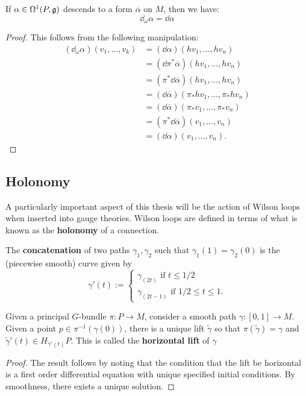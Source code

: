 		\begin{lemma}
			If $\alpha \in \Omega^1 (P, \frak g)$ descends to a form $\overline \alpha$ on $M$, then we have:
			\begin{equation}
				\dd_\omega \alpha = \dd \alpha
			\end{equation}
			\label{lem:pushdown2}
		\end{lemma}
		\begin{proof}
			This follows from the following manipulation:
			\[
				\begin{aligned}
					(\dd_\omega \alpha) (v_1, \dots, v_k) &= (\dd \alpha) (h v_1, \dots, h v_n)\\
					& = (\dd \pi^* \overline \alpha) (h v_1, \dots, h v_n)\\
					& = (\pi^* \dd \overline \alpha) (h v_1, \dots, h v_n)\\
					& = (\dd \overline \alpha) (\pi_* h v_1, \dots, \pi_* h v_n)\\
					& = (\dd \overline \alpha) (\pi_* v_1, \dots, \pi_* v_n)\\
					& = (\pi^* \dd \overline \alpha) (v_1, \dots, v_n)\\
					& = (\dd \alpha) (v_1, \dots, v_n).
				\end{aligned}
			\]
		\end{proof}

		\subsection{Holonomy} %
		\label{sub:holonomy}
		
		
		A particularly important aspect of this thesis will be the action of Wilson loops when inserted into gauge theories. Wilson loops are defined in terms of what is known as the \textbf{holonomy} of a connection.
		
		The \textbf{concatenation} of two paths $\gamma_1, \gamma_2$ such that $\gamma_1(1) = \gamma_2(0)$ is the (piecewise smooth) curve given by
		\[
			\gamma'(t) := \begin{cases}
				\gamma_(2t)\text{ if } t \leq 1/2\\
				\gamma_(2t-1) \text{ if } 1/2 \leq t \leq 1.
			\end{cases}
		\]
		
		\begin{prop}
			Given a principal $G$-bundle $\pi:P\to M$, consider a smooth path $\gamma: [0, 1] \to M$. Given a point $p \in \pi^{-1}(\gamma(0))$, there is a unique lift $\tilde \gamma$ so that $\pi(\tilde \gamma) = \gamma$ and $\tilde \gamma'(t) \in H_{\tilde \gamma'(t)}P$. This is called the \textbf{horizontal lift} of $\gamma$
		\end{prop}
		\begin{proof}
			The result follows by noting that the condition that the lift be horizontal is a first order differential equation with unique specified initial conditions. By smoothness, there exists a unique solution.
		\end{proof}
		
